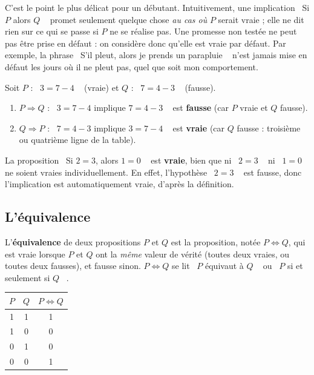 \documentclass[a4paper,12pt,openany]{book}
\providecommand{\og}{\guillemotleft~}
\providecommand{\fg}{\ifhmode~\fi\guillemotright}
\begin{document}
\begin{remarque}
C'est le point le plus délicat pour un débutant. Intuitivement, une implication
\og Si $P$ alors $Q$ \fg{} promet seulement quelque chose \emph{au cas où} $P$
serait vraie ; elle ne dit rien sur ce qui se passe si $P$ ne se réalise pas.
Une promesse non testée ne peut pas être prise en défaut : on considère donc
qu'elle est vraie par défaut. Par exemple, la phrase \og S'il pleut, alors je
prends un parapluie \fg{} n'est jamais mise en défaut les jours où il ne pleut
pas, quel que soit mon comportement.
\end{remarque}

\begin{exemple}
Soit $P$ : \og $3=7-4$ \fg{} (vraie) et $Q$ : \og $7=4-3$ \fg{} (fausse).
\begin{enumerate}
  \item $P\Rightarrow Q$ : \og $3=7-4$ implique $7=4-3$ \fg{} est
  \textbf{fausse} (car $P$ vraie et $Q$ fausse).
  \item $Q\Rightarrow P$ : \og $7=4-3$ implique $3=7-4$ \fg{} est
  \textbf{vraie} (car $Q$ fausse : troisième ou quatrième ligne de la table).
\end{enumerate}
\end{exemple}

\begin{exemple}
La proposition \og Si $2=3$, alors $1=0$ \fg{} est \textbf{vraie}, bien que ni
\og $2=3$ \fg{} ni \og $1=0$ \fg{} ne soient vraies individuellement. En effet,
l'hypothèse \og $2=3$ \fg{} est fausse, donc l'implication est automatiquement
vraie, d'après la définition.
\end{exemple}


\subsection{L'équivalence}

\begin{definition}
L'\textbf{équivalence} de deux propositions $P$ et $Q$ est la proposition,
notée $P\Leftrightarrow Q$, qui est vraie lorsque $P$ et $Q$ ont la
\emph{même} valeur de vérité (toutes deux vraies, ou toutes deux fausses), et
fausse sinon. $P\Leftrightarrow Q$ se lit \og $P$ équivaut à $Q$ \fg{} ou
\og $P$ si et seulement si $Q$ \fg.
\end{definition}

\begin{center}
\begin{tabular}{|c|c|c|}
\hline
$P$ & $Q$ & $P\Leftrightarrow Q$ \\
\hline
1 & 1 & 1 \\
1 & 0 & 0 \\
0 & 1 & 0 \\
0 & 0 & 1 \\
\hline
\end{tabular}
\end{center}
\end{document}
